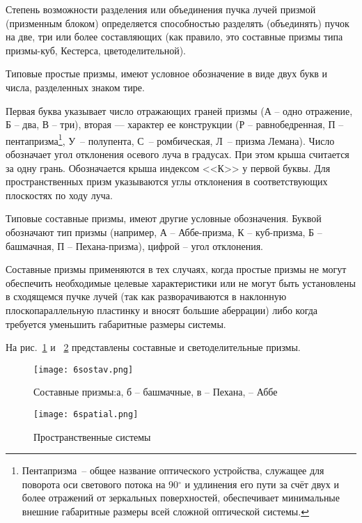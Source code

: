 Степень возможности разделения или объединения пучка лучей призмой (призменным блоком) определяется способностью разделять (объединять) пучок на две, три или более составляющих (как правило, это составные призмы типа призмы-куб, Кестерса, цветоделительной).

Типовые простые призмы, имеют условное обозначение в виде двух букв и числа, разделенных знаком тире.

Первая буква указывает число отражающих граней призмы (А -- одно отражение, Б -- два, В -- три), вторая --- характер ее конструкции (Р --  равнобедренная, П -- пентапризма\footnote{Пентапризма~-- общее название оптического устройства, служащее для поворота оси светового потока на 90$^\circ$ и удлинения его пути за счёт двух и более отражений от зеркальных поверхностей, обеспечивает минимальные внешние габаритные размеры всей сложной оптической системы.}, У~-- полупента, С~-- ромбическая, Л~-- призма Лемана). Число обозначает угол отклонения осевого луча в градусах. При этом крыша считается за одну грань. Обозначается крыша индексом <<К>> у первой буквы. Для пространственных призм указываются углы отклонения в соответствующих плоскостях по ходу луча.

Типовые составные призмы, имеют другие условные обозначения. Буквой обозначают тип призмы (например, А -- Аббе-призма, К -- куб-призма, Б -- башмачная, П -- Пехана-призма), цифрой -- угол отклонения.

Составные призмы применяются в тех случаях, когда простые призмы не могут обеспечить необходимые целевые характеристики или не могут быть установлены в сходящемся пучке лучей (так как разворачиваются в наклонную плоскопараллельную пластинку и вносят большие аберрации) либо когда требуется уменьшить габаритные размеры системы.

На рис.~\ref{pic:6sostav} и ~\ref{pic:6spatial} представлены составные и светоделительные призмы.
\begin{figure}[h!]
	\texttt{[image: 6sostav.png]}
	\caption[Составные призмы]{ Составные призмы:\break а, б -- башмачные, в -- Пехана,  -- Аббе }
	\label{pic:6sostav}
\end{figure}

\begin{figure}[h!]
	\begin{center}
		\caption[Пространственные призменные системы]{ Пространственные  системы }
		\texttt{[image: 6spatial.png]}
		\label{pic:6spatial}
	\end{center}
\end{figure}

